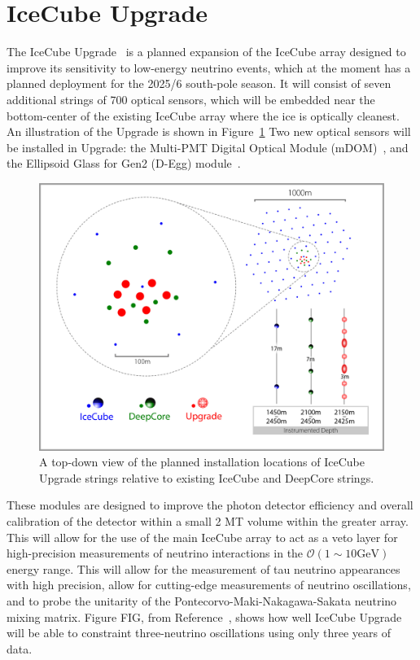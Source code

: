 \documentclass[main.tex]{subfiles}
\begin{document}
\section{IceCube Upgrade}

The IceCube Upgrade~\cite{ishihara2019icecube} is a planned expansion of the IceCube array designed to improve its sensitivity to low-energy neutrino events, which at the moment has a planned deployment for the 2025/6 south-pole season.
It will consist of seven additional strings of 700 optical sensors, which will be embedded near the bottom-center of the existing IceCube array where the ice is optically cleanest. 
An illustration of the Upgrade is shown in Figure~\ref{fig:upgrade_layout}
Two new optical sensors will be installed in Upgrade: the Multi-PMT Digital Optical Module (mDOM)~\cite{classen2019multipmt}, and the Ellipsoid Glass for Gen2 (D-Egg) module~\cite{degg}. 


\begin{figure}
    \centering
    \includegraphics[width=\linewidth]{figures/ICUpgradeLayout_V4b.jpg}
    \caption{A top-down view of the planned installation locations of IceCube Upgrade strings relative to existing IceCube and DeepCore strings.}
    \label{fig:upgrade_layout}
\end{figure}

These modules are designed to improve the photon detector efficiency and overall calibration of the detector within a small 2 MT volume within the greater array. 
This will allow for the use of the main IceCube array to act as a veto layer for high-precision measurements of neutrino interactions in the $\mathcal{O}(1\sim 10\text{GeV})$ energy range. 
This will allow for the measurement of tau neutrino appearances with high precision, allow for cutting-edge measurements of neutrino oscillations, and to probe the unitarity of the Pontecorvo-Maki-Nakagawa-Sakata neutrino mixing matrix. 
Figure FIG, from Reference~\cite{ishihara2019icecube}, shows how well IceCube Upgrade will be able to constraint three-neutrino oscillations using only three years of data. 
\end{document}
